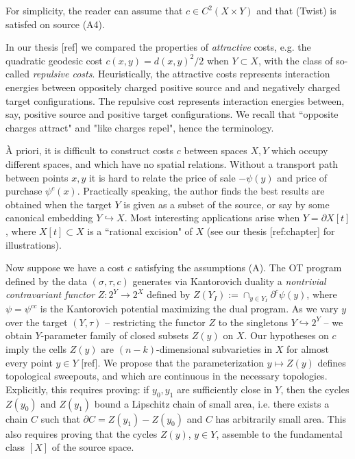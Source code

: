 \documentclass[12pt]{amsart}
\theoremstyle{remark}
\newcommand{\del}{\partial}
\newcommand{\sub}{\del^c \psi(y)}
\begin{document}
For simplicity, the reader can assume that $c\in C^2(X\times Y)$ and that (Twist) is satisfed on source (A4).  

In our thesis [ref] we compared the properties of \emph{attractive} costs, e.g. the quadratic geodesic cost $c(x,y)=d(x,y)^2/2$ when $Y\subset X$, with the class of so-called \emph{repulsive costs}. Heuristically, the attractive costs represents interaction energies between oppositely charged positive source and and negatively charged target configurations. The repulsive cost represents interaction energies between, say, positive source and positive target configurations. We recall that ``opposite charges attract" and "like charges repel", hence the terminology. 


\`A priori, it is difficult to construct costs $c$ between spaces $X, Y$ which occupy different spaces, and which have no spatial relations. Without a transport path between points $x,y$ it is hard to relate the price of sale $-\psi(y)$ and price of purchase $\psi^c(x)$. Practically speaking, the author finds the best results are obtained when the target $Y$ is given as a subset of the source, or say by some canonical embedding $Y\hookrightarrow X$. Most interesting applications arise when $Y=\del X[t]$, where $X[t] \subset X$ is a ``rational excision" of $X$ (see our thesis [ref:chapter] for illustrations). 


Now suppose we have a cost $c$ satisfying the assumptions (A). The OT program defined by the data $(\sigma, \tau, c)$ generates via Kantorovich duality a \emph{nontrivial contravariant functor} $Z: 2^Y \to 2^X$ defined by $Z(Y_I):=\cap_{y\in Y_I} \sub$, where $\psi=\psi^{cc}$ is the Kantorovich potential maximizing the dual program. As we vary $y$ over the target $(Y, \tau)$ -- restricting the functor $Z$ to the singletons $Y \hookrightarrow 2^Y$ -- we obtain $Y$-parameter family of closed subsets $Z(y)$ on $X$. Our hypotheses on $c$ imply the cells $Z(y)$ are $(n-k)$-dimensional subvarieties in $X$ for almost every point $y\in Y$ [ref]. We propose that the parameterization $y\mapsto Z(y)$ defines topological sweepouts, and which are continuous in the necessary topologies. Explicitly, this requires proving: if $y_0, y_1$ are sufficiently close in $Y$, then the cycles $Z(y_0)$ and $Z(y_1)$ bound a Lipschitz chain of small area, i.e. there exists a chain $C$ such that $\del C = Z(y_1)-Z(y_0)$ and $C$ has arbitrarily small area. This also requires proving that the cycles $Z(y)$, $y\in Y$, assemble to the fundamental class $[X]$ of the source space. 
\end{document}
